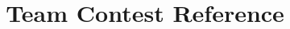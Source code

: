 \documentclass{article}
\title{Team Contest Reference}
\author{\teamname \\ \university}
\begin{document}
\maketitle
\setlength{\columnsep}{1cm}
\begin{multicols}{2}
	\tableofcontents
\end{multicols}
\newpage

\begin{multicols}{2}
  
  
  
  
  
  
  
\end{multicols}
\end{document}

